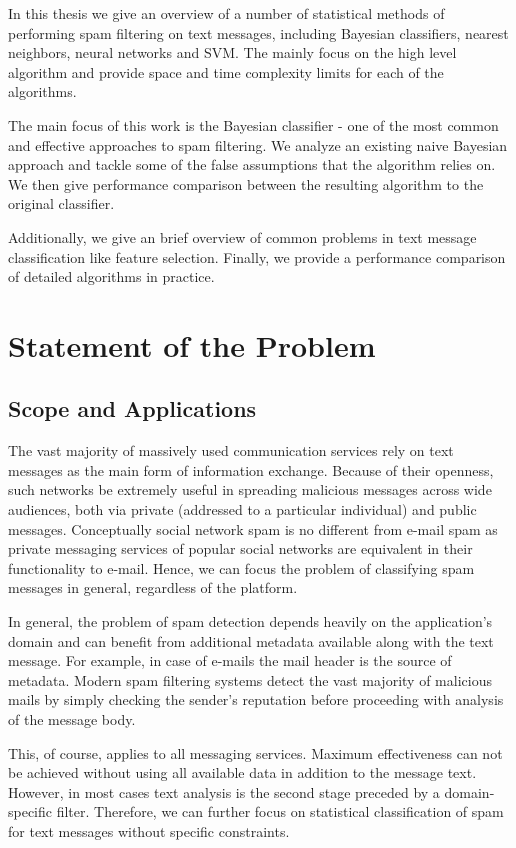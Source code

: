\documentclass[12pt]{report}
\begin{document}
In this thesis we give an overview of a number of statistical methods of performing spam filtering on text messages, including Bayesian classifiers, nearest neighbors, neural networks and SVM. The mainly focus on the high level algorithm and provide space and time complexity limits for each of the algorithms.

The main focus of this work is the Bayesian classifier - one of the most common and effective approaches to spam filtering. We analyze an existing naive Bayesian approach and tackle some of the false assumptions that the algorithm relies on. We then give performance comparison between the resulting algorithm to the original classifier.

Additionally, we give an brief overview of common problems in text message classification like feature selection. Finally, we provide a performance comparison of detailed algorithms in practice.

\newpage


\chapter{Statement of the Problem}

\section{Scope and Applications}

The vast majority of massively used communication services rely on text messages as the main form of information exchange. Because of their openness, such networks be extremely useful in spreading malicious messages across wide audiences, both via private (addressed to a particular individual) and public messages. Conceptually social network spam is no different from e-mail spam as private messaging services of popular social networks are equivalent in their functionality to e-mail. Hence, we can focus the problem of classifying spam messages in general, regardless of the platform.

In general, the problem of spam detection depends heavily on the application's domain and can benefit from additional metadata available along with the text message. For example, in case of e-mails the mail header is the source of metadata. Modern spam filtering systems detect the vast majority of malicious mails by simply checking the sender's reputation before proceeding with analysis of the message body.

This, of course, applies to all messaging services. Maximum effectiveness can not be achieved without using all available data in addition to the message text. However, in most cases text analysis is the second stage preceded by a domain-specific filter. Therefore, we can further focus on statistical classification of spam for text messages without specific constraints.
\end{document}
